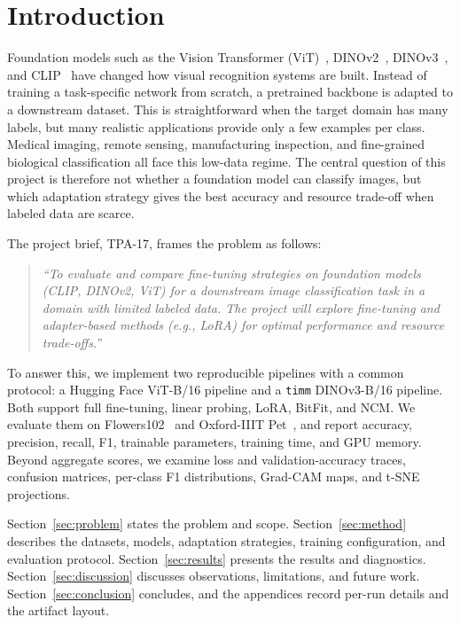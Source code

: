 \documentclass[journal,11pt]{IEEEtran}
\begin{document}
\section{Introduction}
Foundation models such as the Vision Transformer (ViT)~\cite{dosovitskiy2021}, DINOv2~\cite{oquab2024dinov2}, DINOv3~\cite{simeoni2025dinov3}, and CLIP~\cite{radford2021clip} have changed how visual recognition systems are built. Instead of training a task-specific network from scratch, a pretrained backbone is adapted to a downstream dataset. This is straightforward when the target domain has many labels, but many realistic applications provide only a few examples per class. Medical imaging, remote sensing, manufacturing inspection, and fine-grained biological classification all face this low-data regime. The central question of this project is therefore not whether a foundation model can classify images, but which adaptation strategy gives the best accuracy and resource trade-off when labeled data are scarce.

The project brief, TPA-17, frames the problem as follows:
\begin{quote}
\itshape
``To evaluate and compare fine-tuning strategies on foundation models (CLIP, DINOv2, ViT) for a downstream image classification task in a domain with limited labeled data. The project will explore fine-tuning and adapter-based methods (e.g., LoRA) for optimal performance and resource trade-offs.''
\end{quote}

To answer this, we implement two reproducible pipelines with a common protocol: a Hugging Face ViT-B/16 pipeline and a \texttt{timm} DINOv3-B/16 pipeline. Both support full fine-tuning, linear probing, LoRA, BitFit, and NCM. We evaluate them on Flowers102~\cite{nilsback2008flowers} and Oxford-IIIT Pet~\cite{parkhi2012pets}, and report accuracy, precision, recall, F1, trainable parameters, training time, and GPU memory. Beyond aggregate scores, we examine loss and validation-accuracy traces, confusion matrices, per-class F1 distributions, Grad-CAM maps, and t-SNE projections.

Section~\ref{sec:problem} states the problem and scope. Section~\ref{sec:method} describes the datasets, models, adaptation strategies, training configuration, and evaluation protocol. Section~\ref{sec:results} presents the results and diagnostics. Section~\ref{sec:discussion} discusses observations, limitations, and future work. Section~\ref{sec:conclusion} concludes, and the appendices record per-run details and the artifact layout.
\end{document}
